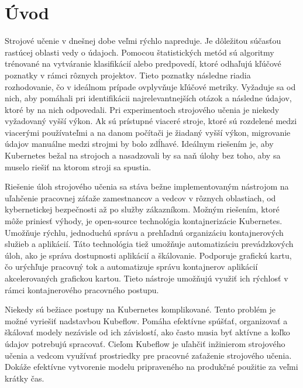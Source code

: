 
{}

\chapter*{Úvod}

Strojové učenie v dnešnej dobe veľmi rýchlo napreduje. Je dôležitou súčasťou rastúcej oblasti vedy o údajoch. Pomocou štatistických metód sú algoritmy trénované na vytváranie klasifikácií alebo predpovedí, ktoré odhaľujú kľúčové poznatky v rámci rôznych projektov. Tieto poznatky následne riadia rozhodovanie, čo v ideálnom prípade ovplyvňuje kľúčové metriky. Vyžaduje sa od nich, aby pomáhali pri identifikácii najrelevantnejších otázok a následne údajov, ktoré by na nich odpovedali. Pri experimentoch strojového učenia je niekedy vyžadovaný vyšší výkon. Ak sú prístupné viaceré stroje, ktoré sú rozdelené medzi viacerými používateľmi a na danom počítači je žiadaný vyšší výkon, migrovanie údajov manuálne medzi strojmi by bolo zdĺhavé. Ideálnym riešením je, aby Kubernetes bežal na strojoch a nasadzovali by sa naň úlohy bez toho, aby sa muselo riešiť na ktorom stroji sa spustia.

Riešenie úloh strojového učenia sa stáva bežne implementovaným nástrojom na uľahčenie pracovnej záťaže zamestnancov a vedcov v rôznych oblastiach, od kybernetickej bezpečnosti až po služby zákazníkom. Možným riešením, ktoré môže priniesť výhody, je open-source technológia kontajnerizácie Kubernetes. Umožňuje rýchlu, jednoduchú správu a prehľadnú organizáciu kontajnerových služieb a aplikácií. Táto technológia tiež umožňuje automatizáciu prevádzkových úloh, ako je správa dostupnosti aplikácií a škálovanie. Podporuje grafickú kartu, čo urýchľuje pracovný tok a automatizuje správu kontajnerov aplikácií akcelerovaných grafickou kartou. Tieto nástroje umožňujú využiť ich rýchlosť v rámci kontajnerového pracovného postupu.

Niekedy sú bežiace postupy na Kubernetes komplikované. Tento problém je možné vyriešiť nadstavbou Kubeflow. Pomáha efektívne spúšťať, organizovať a škálovať modely nezávisle od ich závislostí, ako často musia byť aktívne a koľko údajov potrebujú spracovať. Cieľom Kubeflow je uľahčiť inžinierom strojového učenia a vedcom využívať prostriedky pre pracovné zaťaženie strojového učenia. Dokáže efektívne vytvorenie modelu pripraveného na produkčné použitie za veľmi krátky čas.

